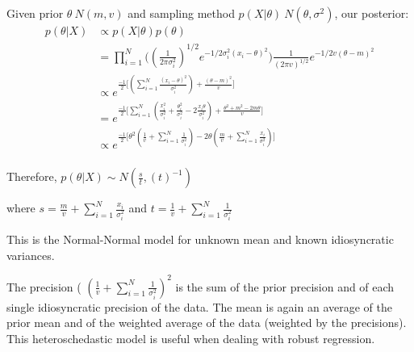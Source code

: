 \documentclass{homework}
\begin{document}
\begin{enumerate}[label=(\Alph*)]
\par Given prior $\theta ~ N(m,v)$ and sampling method $p(X | \theta ) ~ N(\theta, \sigma^2)$, our posterior:
\begin{equation} \begin{split}
p(\theta | X ) & \propto p(X | \theta) p(\theta) \\
& = \prod_{i=1}^N\big(  (\frac{1}{2\pi \sigma_i^2})^{1/2}e^{ -1/2\sigma_i^2 (x_i - \theta)^2} \big) \frac{1}{(2\pi v)^{1/2}} e^{ -1/2v ( \theta - m )^2 } \\
& \propto e^{\frac{-1}{2}\big[ ( \sum_{i=1}^N \frac{(x_i - \theta)^2}{\sigma_i^2} ) + \frac{(\theta - m)^2}{v} \big]} \\
& = e^{\frac{-1}{2}\big[ \sum_{i=1}^N ( \frac{x_i ^2}{\sigma_i^2} + \frac{\theta_i ^2}{\sigma_i^2} - 2\frac{x_i\theta}{\sigma_i^2} ) + \frac{ \theta^2 + m^2 -2m\theta}{v} \big] }\\
& \propto e^{\frac{-1}{2}\big[ \theta^2 ( \frac{1}{v} + \sum_{i=1}^N\frac{1}{\sigma_i^2} ) - 2\theta( \frac{m}{v} + \sum_{i=1}^N \frac{x_i}{\sigma_i^2}) \big] } \\
 \end{split}  \end{equation}
\par Therefore, $p(\theta | X ) \sim N( \frac{s}{t} , (t)^{-1})$ 
\par where $s =\frac{m}{v} + \sum_{i=1}^N \frac{x_i}{\sigma_i^2} $ and $t = \frac{1}{v} + \sum_{i=1}^N\frac{1}{\sigma_i^2}$ 
\par \noindent * This is the Normal-Normal model for unknown mean and known idiosyncratic variances.
\par \noindent The precision ( $(\frac{1}{v} + \sum_{i=1}^N\frac{1}{\sigma_i^2})^2$ is the sum of the prior precision and of each single idiosyncratic precision of the data. The mean is again an average of the prior mean and of the weighted average of the data (weighted by the precisions). This heteroschedastic model is useful when dealing with robust regression.



\end{enumerate}
\end{document}
